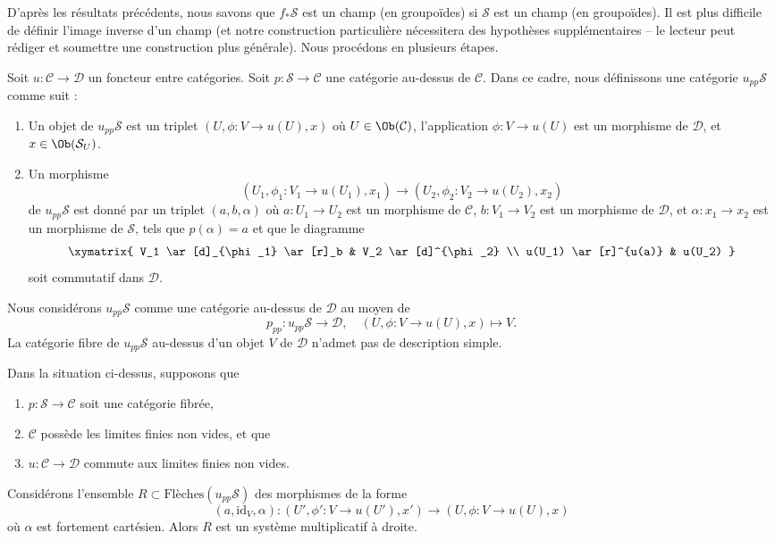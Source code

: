 \noindent
D'après les résultats précédents, nous savons que $f_*\mathcal{S}$ est un champ (en groupoïdes)
si $\mathcal{S}$ est un champ (en groupoïdes).
Il est plus difficile de définir l'image inverse d'un champ (et notre construction
particulière nécessitera des hypothèses supplémentaires -- le lecteur peut rédiger et
soumettre une construction plus générale). Nous procédons en plusieurs étapes.

\medskip\noindent
Soit $u : \mathcal{C} \to \mathcal{D}$ un foncteur entre catégories.
Soit $p : \mathcal{S} \to \mathcal{C}$ une catégorie au-dessus de $\mathcal{C}$.
Dans ce cadre, nous définissons une catégorie $u_{pp}\mathcal{S}$ comme suit :
\begin{enumerate}
\item Un objet de $u_{pp}\mathcal{S}$ est un triplet
$(U, \phi : V \to u(U), x)$ où $U \in \Ob(\mathcal{C})$,
l'application $\phi : V \to u(U)$ est un morphisme de $\mathcal{D}$,
et $x \in \Ob(\mathcal{S}_U)$.
\item Un morphisme
$$
(U_1, \phi_1 : V_1 \to u(U_1), x_1)
\longrightarrow
(U_2, \phi_2 : V_2 \to u(U_2), x_2)
$$
de $u_{pp}\mathcal{S}$ est donné par un
triplet $(a, b, \alpha)$ où $a : U_1 \to U_2$ est un morphisme de $\mathcal{C}$,
$b : V_1 \to V_2$ est un morphisme de $\mathcal{D}$, et
$\alpha : x_1 \to x_2$ est un morphisme de $\mathcal{S}$,
tels que $p(\alpha) = a$ et que le diagramme
$$
\xymatrix{
V_1 \ar[d]_{\phi_1} \ar[r]_b & V_2 \ar[d]^{\phi_2} \\
u(U_1) \ar[r]^{u(a)} & u(U_2)
}
$$
soit commutatif dans $\mathcal{D}$.
\end{enumerate}
Nous considérons $u_{pp}\mathcal{S}$ comme une catégorie au-dessus de $\mathcal{D}$ au moyen de
$$
p_{pp} : u_{pp}\mathcal{S} \longrightarrow \mathcal{D},
\quad
(U, \phi : V \to u(U), x) \longmapsto V.
$$
La catégorie fibre de $u_{pp}\mathcal{S}$ au-dessus d'un objet $V$ de $\mathcal{D}$
n'admet pas de description simple.

\begin{lemma}
\label{lemma-right-multiplicative-system}
Dans la situation ci-dessus, supposons que
\begin{enumerate}
\item $p : \mathcal{S} \to \mathcal{C}$ soit une catégorie fibrée,
\item $\mathcal{C}$ possède les limites finies non vides, et que
\item $u : \mathcal{C} \to \mathcal{D}$ commute aux limites finies non vides.
\end{enumerate}
Considérons l'ensemble $R \subset \text{Flèches}(u_{pp}\mathcal{S})$ des morphismes
de la forme
$$
(a, \text{id}_V, \alpha) :
(U', \phi' : V \to u(U'), x')
\longrightarrow
(U, \phi : V \to u(U), x)
$$
où $\alpha$ est fortement cartésien. Alors $R$ est un système multiplicatif à droite.
\end{lemma}

